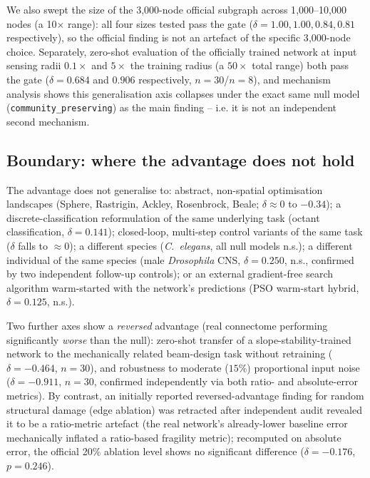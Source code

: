 \documentclass[11pt]{article}
\begin{document}
We also swept the size of the 3{,}000-node official subgraph across
1{,}000--10{,}000 nodes (a 10$\times$ range): all four sizes tested pass
the gate ($\delta = 1.00, 1.00, 0.84, 0.81$ respectively), so the official
finding is not an artefact of the specific 3{,}000-node choice. Separately,
zero-shot evaluation of the officially trained network at input sensing
radii $0.1\times$ and $5\times$ the training radius (a $50\times$ total
range) both pass the gate ($\delta = 0.684$ and $0.906$ respectively,
$n=30$/$n=8$), and mechanism analysis shows this generalisation axis
collapses under the exact same null model (\texttt{community\_preserving})
as the main finding -- i.e. it is not an independent second mechanism.

\subsection{Boundary: where the advantage does not hold}

The advantage does not generalise to: abstract, non-spatial optimisation
landscapes (Sphere, Rastrigin, Ackley, Rosenbrock, Beale; $\delta \approx
0$ to $-0.34$); a discrete-classification reformulation of the same
underlying task (octant classification, $\delta=0.141$); closed-loop,
multi-step control variants of the same task ($\delta$ falls to
$\approx 0$); a different species (\emph{C.~elegans}, all null models
n.s.); a different individual of the same species (male \emph{Drosophila}
CNS, $\delta=0.250$, n.s., confirmed by two independent follow-up
controls); or an external gradient-free search algorithm warm-started
with the network's predictions (PSO warm-start hybrid, $\delta=0.125$,
n.s.).

Two further axes show a \emph{reversed} advantage (real connectome
performing significantly \emph{worse} than the null): zero-shot transfer
of a slope-stability-trained network to the mechanically related
beam-design task without retraining ($\delta=-0.464$, $n=30$), and
robustness to moderate ($15\%$) proportional input noise ($\delta=-0.911$,
$n=30$, confirmed independently via both ratio- and absolute-error
metrics). By contrast, an initially reported reversed-advantage finding
for random structural damage (edge ablation) was retracted after
independent audit revealed it to be a ratio-metric artefact (the real
network's already-lower baseline error mechanically inflated a
ratio-based fragility metric); recomputed on absolute error, the
official 20\% ablation level shows no significant difference
($\delta=-0.176$, $p=0.246$).
\end{document}
